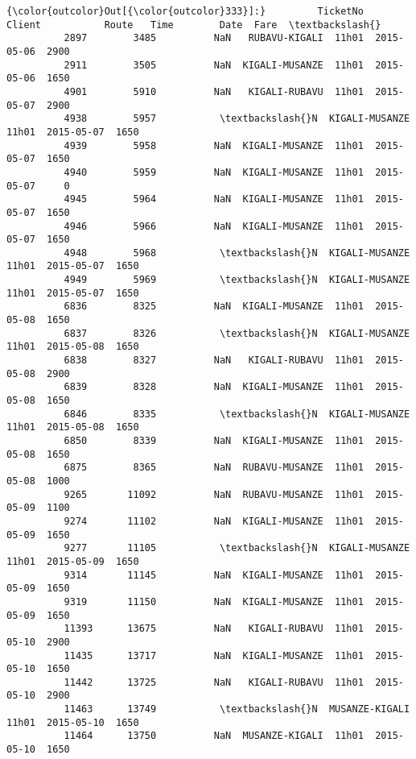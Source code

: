 \documentclass[11pt]{article}
\begin{document}
\begin{Verbatim}[commandchars=\\\{\}]
{\color{outcolor}Out[{\color{outcolor}333}]:}         TicketNo       Client           Route   Time        Date  Fare  \textbackslash{}
          2897        3485          NaN   RUBAVU-KIGALI  11h01  2015-05-06  2900   
          2911        3505          NaN  KIGALI-MUSANZE  11h01  2015-05-06  1650   
          4901        5910          NaN   KIGALI-RUBAVU  11h01  2015-05-07  2900   
          4938        5957           \textbackslash{}N  KIGALI-MUSANZE  11h01  2015-05-07  1650   
          4939        5958          NaN  KIGALI-MUSANZE  11h01  2015-05-07  1650   
          4940        5959          NaN  KIGALI-MUSANZE  11h01  2015-05-07     0   
          4945        5964          NaN  KIGALI-MUSANZE  11h01  2015-05-07  1650   
          4946        5966          NaN  KIGALI-MUSANZE  11h01  2015-05-07  1650   
          4948        5968           \textbackslash{}N  KIGALI-MUSANZE  11h01  2015-05-07  1650   
          4949        5969           \textbackslash{}N  KIGALI-MUSANZE  11h01  2015-05-07  1650   
          6836        8325          NaN  KIGALI-MUSANZE  11h01  2015-05-08  1650   
          6837        8326           \textbackslash{}N  KIGALI-MUSANZE  11h01  2015-05-08  1650   
          6838        8327          NaN   KIGALI-RUBAVU  11h01  2015-05-08  2900   
          6839        8328          NaN  KIGALI-MUSANZE  11h01  2015-05-08  1650   
          6846        8335           \textbackslash{}N  KIGALI-MUSANZE  11h01  2015-05-08  1650   
          6850        8339          NaN  KIGALI-MUSANZE  11h01  2015-05-08  1650   
          6875        8365          NaN  RUBAVU-MUSANZE  11h01  2015-05-08  1000   
          9265       11092          NaN  RUBAVU-MUSANZE  11h01  2015-05-09  1100   
          9274       11102          NaN  KIGALI-MUSANZE  11h01  2015-05-09  1650   
          9277       11105           \textbackslash{}N  KIGALI-MUSANZE  11h01  2015-05-09  1650   
          9314       11145          NaN  KIGALI-MUSANZE  11h01  2015-05-09  1650   
          9319       11150          NaN  KIGALI-MUSANZE  11h01  2015-05-09  1650   
          11393      13675          NaN   KIGALI-RUBAVU  11h01  2015-05-10  2900   
          11435      13717          NaN  KIGALI-MUSANZE  11h01  2015-05-10  1650   
          11442      13725          NaN   KIGALI-RUBAVU  11h01  2015-05-10  2900   
          11463      13749           \textbackslash{}N  MUSANZE-KIGALI  11h01  2015-05-10  1650   
          11464      13750          NaN  MUSANZE-KIGALI  11h01  2015-05-10  1650   

\end{Verbatim}
\end{document}
